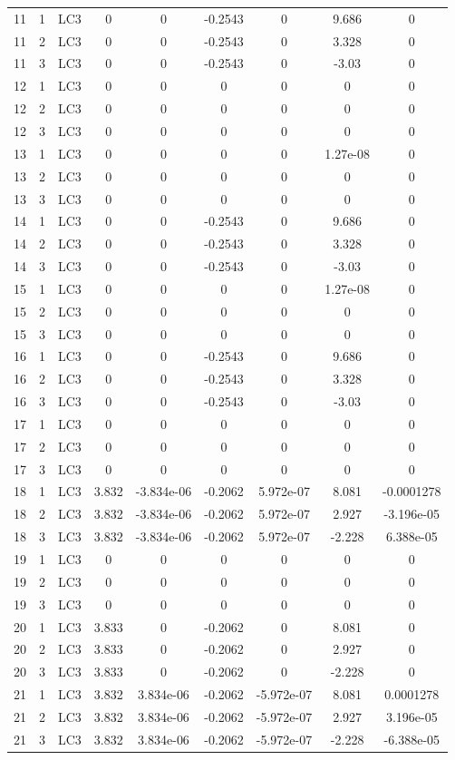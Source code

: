 \documentclass{article}%
\begin{document}
\begin{longtable}{| c c c | c c c c c c |}
11&1&LC3&0&0&{-}0.2543&0&9.686&0\\%
11&2&LC3&0&0&{-}0.2543&0&3.328&0\\%
11&3&LC3&0&0&{-}0.2543&0&{-}3.03&0\\%
12&1&LC3&0&0&0&0&0&0\\%
12&2&LC3&0&0&0&0&0&0\\%
12&3&LC3&0&0&0&0&0&0\\%
13&1&LC3&0&0&0&0&1.27e{-}08&0\\%
13&2&LC3&0&0&0&0&0&0\\%
13&3&LC3&0&0&0&0&0&0\\%
14&1&LC3&0&0&{-}0.2543&0&9.686&0\\%
14&2&LC3&0&0&{-}0.2543&0&3.328&0\\%
14&3&LC3&0&0&{-}0.2543&0&{-}3.03&0\\%
15&1&LC3&0&0&0&0&1.27e{-}08&0\\%
15&2&LC3&0&0&0&0&0&0\\%
15&3&LC3&0&0&0&0&0&0\\%
16&1&LC3&0&0&{-}0.2543&0&9.686&0\\%
16&2&LC3&0&0&{-}0.2543&0&3.328&0\\%
16&3&LC3&0&0&{-}0.2543&0&{-}3.03&0\\%
17&1&LC3&0&0&0&0&0&0\\%
17&2&LC3&0&0&0&0&0&0\\%
17&3&LC3&0&0&0&0&0&0\\%
18&1&LC3&3.832&{-}3.834e{-}06&{-}0.2062&5.972e{-}07&8.081&{-}0.0001278\\%
18&2&LC3&3.832&{-}3.834e{-}06&{-}0.2062&5.972e{-}07&2.927&{-}3.196e{-}05\\%
18&3&LC3&3.832&{-}3.834e{-}06&{-}0.2062&5.972e{-}07&{-}2.228&6.388e{-}05\\%
19&1&LC3&0&0&0&0&0&0\\%
19&2&LC3&0&0&0&0&0&0\\%
19&3&LC3&0&0&0&0&0&0\\%
20&1&LC3&3.833&0&{-}0.2062&0&8.081&0\\%
20&2&LC3&3.833&0&{-}0.2062&0&2.927&0\\%
20&3&LC3&3.833&0&{-}0.2062&0&{-}2.228&0\\%
21&1&LC3&3.832&3.834e{-}06&{-}0.2062&{-}5.972e{-}07&8.081&0.0001278\\%
21&2&LC3&3.832&3.834e{-}06&{-}0.2062&{-}5.972e{-}07&2.927&3.196e{-}05\\%
21&3&LC3&3.832&3.834e{-}06&{-}0.2062&{-}5.972e{-}07&{-}2.228&{-}6.388e{-}05\\%

\end{longtable}
\end{document}
